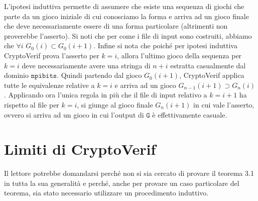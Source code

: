 \documentclass[a4paper,openright,twoside,12pt]{report}
\begin{document}
L'ipotesi induttiva permette di assumere che esiste una sequenza di giochi che parte da un gioco iniziale di cui conosciamo la forma
e arriva ad un gioco finale che deve necessariamente essere di una forma particolare (altrimenti non proverebbe l'asserto).
Si noti che per come i file di input sono costruiti, abbiamo che $\forall i$ $G_0(i) \subset G_0(i+1)$. 
Infine si nota che poich\'e per ipotesi induttiva CryptoVerif prova l'asserto per $k=i$, allora 
l'ultimo gioco della sequenza per $k=i$ deve necessariamente avere una stringa di $n+i$ estratta casualmente dal dominio $\texttt{npibits}$. 
Quindi partendo dal gioco $G_0(i+1)$, CryptoVerif applica tutte le equivalenze relative a $k=i$ e arriva
ad un gioco $G_{n-1}(i+1) \supset G_{n}(i)$. Applicando ora l'unica regola in pi\`u che il file di input relativo 
a $k=i+1$ ha rispetto al file per $k=i$, si giunge al gioco finale $G_n(i+1)$ in cui vale l'asserto, ovvero
si arriva ad un gioco in cui l'output di $\texttt{G}$ \`e effettivamente casuale.

\section{Limiti di CryptoVerif}
Il lettore potrebbe domandarsi perché non si sia cercato di provare il teorema 3.1 in tutta la sua generalit\`a e 
perch\'e, anche per provare un caso particolare del teorema, sia stato necessario utilizzare un procedimento induttivo.
\end{document}
